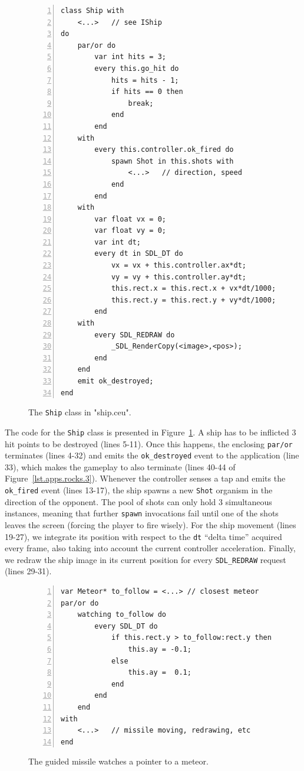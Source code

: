 \documentclass{sigplanconf}
\newcommand{\code}[1] {{\small{\texttt{#1}}}}
\newcommand{\1}{\;}
\newcommand{\2}{\;\;}
\newcommand{\3}{\;\;\;}
\newcommand{\5}{\;\;\;\;\;}
\begin{document}
\begin{figure}%
\begin{lstlisting}[numbers=left,xleftmargin=3em]
class Ship with
    <...>   // see IShip
do
    par/or do
        var int hits = 3;
        every this.go_hit do
            hits = hits - 1;
            if hits == 0 then
                break;
            end
        end
    with
        every this.controller.ok_fired do
            spawn Shot in this.shots with
                <...>   // direction, speed
            end
        end
    with
        var float vx = 0;
        var float vy = 0;
        var int dt;
        every dt in SDL_DT do
            vx = vx + this.controller.ax*dt;
            vy = vy + this.controller.ay*dt;
            this.rect.x = this.rect.x + vx*dt/1000;
            this.rect.y = this.rect.y + vy*dt/1000;
        end
    with
        every SDL_REDRAW do
            _SDL_RenderCopy(<image>,<pos>);
        end
    end
    emit ok_destroyed;
end
\end{lstlisting}
\caption{ The \code{Ship} class in "ship.ceu".
\label{lst.apps.rocks.4}
}
\end{figure}

The code for the \code{Ship} class is presented in 
Figure~\ref{lst.apps.rocks.4}.
%
A ship has to be inflicted 3 hit points to be destroyed (lines 5-11).
Once this happens, the enclosing \code{par/or} terminates (lines 4-32) and 
emits the \code{ok\_destroyed} event to the application (line 33), which makes 
the gameplay to also terminate (lines 40-44 of Figure~\ref{lst.apps.rocks.3}).
%
Whenever the controller senses a tap and emits the \code{ok\_fired} event 
(lines 13-17), the ship spawns a new \code{Shot} organism in the direction of 
the opponent.
The pool of shots can only hold 3 simultaneous instances, meaning that further
\code{spawn} invocations fail until one of the shots leaves the screen (forcing 
the player to fire wisely).
%
For the ship movement (lines 19-27), we integrate its position with respect to 
the \code{dt} ``delta time'' acquired every frame, also taking into account the 
current controller acceleration.
%
Finally, we redraw the ship image in its current position for every 
\code{SDL\_REDRAW} request (lines 29-31).

\begin{figure}%
\begin{lstlisting}[numbers=left,xleftmargin=3em]
var Meteor* to_follow = <...> // closest meteor
par/or do
    watching to_follow do
        every SDL_DT do
            if this.rect.y > to_follow:rect.y then
                this.ay = -0.1;
            else
                this.ay =  0.1;
            end
        end
    end
with
    <...>   // missile moving, redrawing, etc
end
\end{lstlisting}
\caption{ The guided missile watches a pointer to a meteor.
\label{lst.apps.rocks.5}
}
\end{figure}
\end{document}
